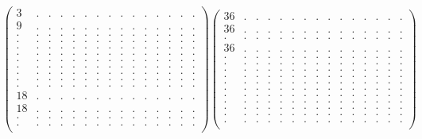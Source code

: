 \documentclass[12pt,a4paper]{amsart}
\begin{document}
\begin{align*}
\left(\begin{array}{rrrrrrrrrrrrrrr}%
3&.&.&.&.&.&.&.&.&.&.&.&.&.&.\\%
9&.&.&.&.&.&.&.&.&.&.&.&.&.&.\\%
.&.&.&.&.&.&.&.&.&.&.&.&.&.&.\\%
.&.&.&.&.&.&.&.&.&.&.&.&.&.&.\\%
.&.&.&.&.&.&.&.&.&.&.&.&.&.&.\\%
.&.&.&.&.&.&.&.&.&.&.&.&.&.&.\\%
.&.&.&.&.&.&.&.&.&.&.&.&.&.&.\\%
.&.&.&.&.&.&.&.&.&.&.&.&.&.&.\\%
.&.&.&.&.&.&.&.&.&.&.&.&.&.&.\\%
.&.&.&.&.&.&.&.&.&.&.&.&.&.&.\\%
.&.&.&.&.&.&.&.&.&.&.&.&.&.&.\\%
18&.&.&.&.&.&.&.&.&.&.&.&.&.&.\\%
18&.&.&.&.&.&.&.&.&.&.&.&.&.&.\\%
.&.&.&.&.&.&.&.&.&.&.&.&.&.&.\\%
.&.&.&.&.&.&.&.&.&.&.&.&.&.&.\\%
\end{array}\right)%
\left(\begin{array}{rrrrrrrrrrrrrrr}%
36&.&.&.&.&.&.&.&.&.&.&.&.&.&.\\%
36&.&.&.&.&.&.&.&.&.&.&.&.&.&.\\%
.&.&.&.&.&.&.&.&.&.&.&.&.&.&.\\%
36&.&.&.&.&.&.&.&.&.&.&.&.&.&.\\%
.&.&.&.&.&.&.&.&.&.&.&.&.&.&.\\%
.&.&.&.&.&.&.&.&.&.&.&.&.&.&.\\%
.&.&.&.&.&.&.&.&.&.&.&.&.&.&.\\%
.&.&.&.&.&.&.&.&.&.&.&.&.&.&.\\%
.&.&.&.&.&.&.&.&.&.&.&.&.&.&.\\%
.&.&.&.&.&.&.&.&.&.&.&.&.&.&.\\%
.&.&.&.&.&.&.&.&.&.&.&.&.&.&.\\%
.&.&.&.&.&.&.&.&.&.&.&.&.&.&.\\%
.&.&.&.&.&.&.&.&.&.&.&.&.&.&.\\%
.&.&.&.&.&.&.&.&.&.&.&.&.&.&.\\%
.&.&.&.&.&.&.&.&.&.&.&.&.&.&.\\%
\end{array}\right)%
\end{align*}
\end{document}
